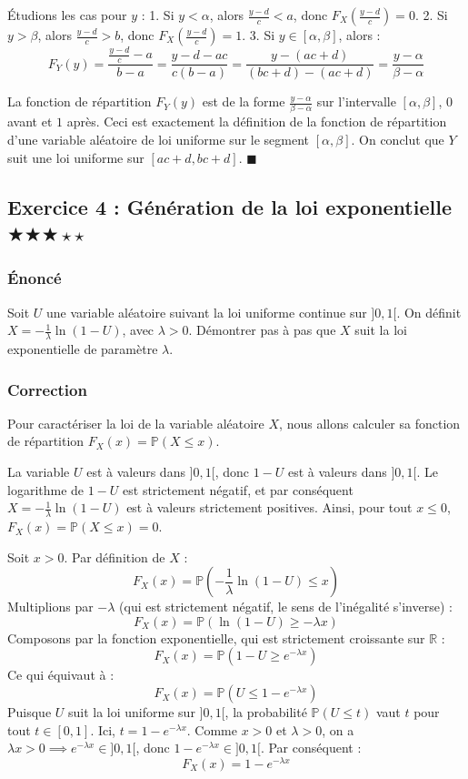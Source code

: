 \documentclass[11pt,a4paper]{article}
\begin{document}
Étudions les cas pour $y$ :
1. Si $y < \alpha$, alors $\frac{y - d}{c} < a$, donc $F_X\left(\frac{y - d}{c}\right) = 0$.
2. Si $y > \beta$, alors $\frac{y - d}{c} > b$, donc $F_X\left(\frac{y - d}{c}\right) = 1$.
3. Si $y \in [\alpha, \beta]$, alors :
$$ F_Y(y) = \frac{\frac{y - d}{c} - a}{b - a} = \frac{y - d - ac}{c(b - a)} = \frac{y - (ac+d)}{(bc+d) - (ac+d)} = \frac{y - \alpha}{\beta - \alpha} $$

La fonction de répartition $F_Y(y)$ est de la forme $\frac{y-\alpha}{\beta-\alpha}$ sur l'intervalle $[\alpha, \beta]$, $0$ avant et $1$ après. Ceci est exactement la définition de la fonction de répartition d'une variable aléatoire de loi uniforme sur le segment $[\alpha, \beta]$.
On conclut que $Y$ suit une loi uniforme sur $[ac+d, bc+d]$. $\blacksquare$


\subsection*{Exercice 4 : Génération de la loi exponentielle \quad $\bigstar\bigstar\bigstar\star\star$}

\subsubsection*{Énoncé}

Soit $U$ une variable aléatoire suivant la loi uniforme continue sur $]0, 1[$.
On définit $X = -\frac{1}{\lambda} \ln(1-U)$, avec $\lambda > 0$.
Démontrer pas à pas que $X$ suit la loi exponentielle de paramètre $\lambda$.

\subsubsection*{Correction}

Pour caractériser la loi de la variable aléatoire $X$, nous allons calculer sa fonction de répartition $F_X(x) = \mathbb{P}(X \leq x)$.

La variable $U$ est à valeurs dans $]0, 1[$, donc $1-U$ est à valeurs dans $]0, 1[$. Le logarithme de $1-U$ est strictement négatif, et par conséquent $X = -\frac{1}{\lambda} \ln(1-U)$ est à valeurs strictement positives.
Ainsi, pour tout $x \leq 0$, $F_X(x) = \mathbb{P}(X \leq x) = 0$.

Soit $x > 0$. Par définition de $X$ :
$$ F_X(x) = \mathbb{P}\left(-\frac{1}{\lambda} \ln(1-U) \leq x\right) $$
Multiplions par $-\lambda$ (qui est strictement négatif, le sens de l'inégalité s'inverse) :
$$ F_X(x) = \mathbb{P}(\ln(1-U) \geq -\lambda x) $$
Composons par la fonction exponentielle, qui est strictement croissante sur $\mathbb{R}$ :
$$ F_X(x) = \mathbb{P}(1-U \geq e^{-\lambda x}) $$
Ce qui équivaut à :
$$ F_X(x) = \mathbb{P}(U \leq 1 - e^{-\lambda x}) $$
Puisque $U$ suit la loi uniforme sur $]0, 1[$, la probabilité $\mathbb{P}(U \leq t)$ vaut $t$ pour tout $t \in [0, 1]$.
Ici, $t = 1 - e^{-\lambda x}$. Comme $x > 0$ et $\lambda > 0$, on a $\lambda x > 0 \implies e^{-\lambda x} \in ]0, 1[$, donc $1 - e^{-\lambda x} \in ]0, 1[$.
Par conséquent :
$$ F_X(x) = 1 - e^{-\lambda x} $$
\end{document}
